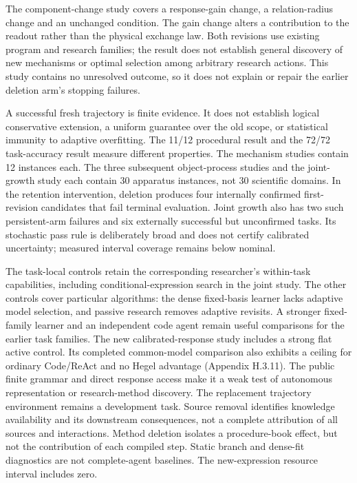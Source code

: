 \documentclass[11pt,a4paper]{article}
\begin{document}
The component-change study covers a response-gain change, a relation-radius change and an unchanged condition. The gain change alters a contribution to the readout rather than the physical exchange law. Both revisions use existing program and research families; the result does not establish general discovery of new mechanisms or optimal selection among arbitrary research actions. This study contains no unresolved outcome, so it does not explain or repair the earlier deletion arm's stopping failures.


A successful fresh trajectory is finite evidence. It does not establish logical
conservative extension, a uniform guarantee over the old scope, or statistical
immunity to adaptive overfitting. The 11/12 procedural result and the 72/72
task-accuracy result measure different properties. The mechanism studies contain
12 instances each. The three subsequent object-process studies and the
joint-growth study each contain 30 apparatus instances, not 30 scientific
domains. In the retention intervention, deletion produces four internally
confirmed first-revision candidates that fail terminal evaluation. Joint growth
also has two such persistent-arm failures and six externally successful but
unconfirmed tasks. Its stochastic pass rule is deliberately broad and does not
certify calibrated uncertainty; measured interval coverage remains below nominal.


The task-local controls retain the corresponding researcher's within-task
capabilities, including conditional-expression search in the joint study. The
other controls cover particular algorithms: the dense fixed-basis learner lacks
adaptive model selection, and passive research removes adaptive revisits. A
stronger fixed-family learner and an independent code agent remain useful
comparisons for the earlier task families. The new calibrated-response study
includes a strong flat active control. Its completed common-model comparison
also exhibits a ceiling for ordinary Code/ReAct and no Hegel advantage (Appendix
H.3.11). The public finite grammar and direct response access make it a weak test
of autonomous representation or research-method discovery. The replacement
trajectory environment remains a development task.
Source removal identifies knowledge availability and its downstream
consequences, not a complete attribution of all sources and interactions. Method
deletion isolates a procedure-book effect, but not the contribution of each
compiled step. Static branch and dense-fit diagnostics are not complete-agent
baselines. The new-expression resource interval includes zero.
\end{document}
